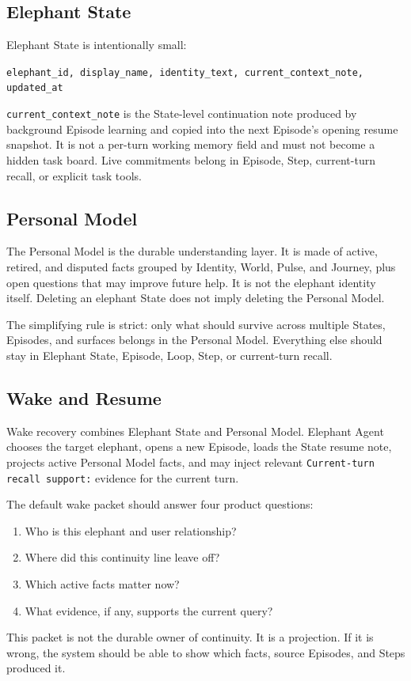 \subsection{Elephant State}

Elephant State is intentionally small:

\begin{center}
\texttt{elephant\_id, display\_name, identity\_text, current\_context\_note, updated\_at}
\end{center}

\texttt{current\_context\_note} is the State-level continuation note produced
by background Episode learning and copied into the next Episode's opening
resume snapshot. It is not a per-turn working memory field and must not become
a hidden task board. Live commitments belong in Episode, Step, current-turn
recall, or explicit task tools.

\subsection{Personal Model}

The Personal Model is the durable understanding layer. It is made of active,
retired, and disputed facts grouped by Identity, World, Pulse, and Journey, plus
open questions that may improve future help. It is not the elephant identity itself.
Deleting an elephant State does not imply deleting the Personal Model.

The simplifying rule is strict: only what should survive across multiple
States, Episodes, and surfaces belongs in the Personal Model. Everything else
should stay in Elephant State, Episode, Loop, Step, or current-turn recall.

\subsection{Wake and Resume}

Wake recovery combines Elephant State and Personal Model. Elephant Agent chooses the target
elephant, opens a new Episode, loads the State resume note, projects active Personal
Model facts, and may inject relevant \texttt{Current-turn recall support:} evidence for the
current turn.

The default wake packet should answer four product questions:

\begin{enumerate}[leftmargin=*]
  \item Who is this elephant and user relationship?
  \item Where did this continuity line leave off?
  \item Which active facts matter now?
  \item What evidence, if any, supports the current query?
\end{enumerate}

This packet is not the durable owner of continuity. It is a projection. If it
is wrong, the system should be able to show which facts, source Episodes, and
Steps produced it.
